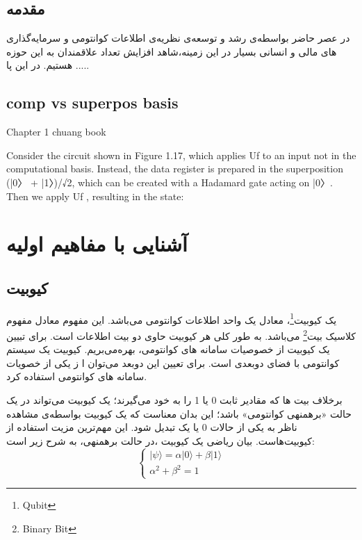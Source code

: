 \documentclass{book}
\begin{document}
\tableofcontents
\section{مقدمه}	
در عصر حاضر بواسطه‌ی رشد و توسعه‌ی نظریه‌ی اطلاعات کوانتومی و سرمایه‌گذاری های مالی و انسانی بسیار در این زمینه،‌شاهد افزایش تعداد علاقمندان به این حوزه هستیم. در این پا .....

\section{comp vs superpos basis}

Chapter 1 chuang book

Consider the circuit shown in Figure 1.17, which applies Uf to an input not in the
computational basis. Instead, the data register is prepared in the superposition (|0〉 +
|1〉)/√2, which can be created with a Hadamard gate acting on |0〉. Then we apply Uf ,
resulting in the state:



\chapter{آشنایی با مفاهیم اولیه}
\section{کیوبیت}

یک کیوبیت\footnote{Qubit}، معادل یک واحد اطلاعات کوانتومی می‌باشد. این مفهوم معادل مفهوم کلاسیک بیت\footnote{Binary Bit} می‌باشد. به طور کلی هر کیوبیت حاوی دو بیت اطلاعات است. برای تبیین یک کیوبیت از خصوصیات سامانه های کوانتومی، بهره‌می‌بریم. کیوبیت یک سیستم کوانتومی با فضای دوبعدی است. برای تعیین این دوبعد می‌توان ا ز یکی از خصویات سامانه های کوانتومی استفاده کرد. 

برخلاف بیت ها که مقادیر ثابت 0 یا 1 را به خود می‌گیرند؛ یک کیوبیت می‌تواند در یک حالت «برهمنهی کوانتومی» باشد؛ این بدان معناست که یک کیوبیت بواسطه‌ی مشاهده ناظر به یکی از حالات 0 یا یک تبدیل شود. این مهم‌ترین مزیت استفاده از کیوبیت‌هاست. بیان ریاضی یک کیوبیت ،در حالت برهمنهی، به شرح زیر است:
\vspace{2cm}
$$
\left\{
\begin{array}{ll}
	  \vert \psi \rangle = \alpha\vert 0 \rangle + \beta\vert 1 \rangle \\
	  \alpha^2 + \beta^2 = 1
\end{array}
\right.
$$
\vspace{2cm}
\end{document}
